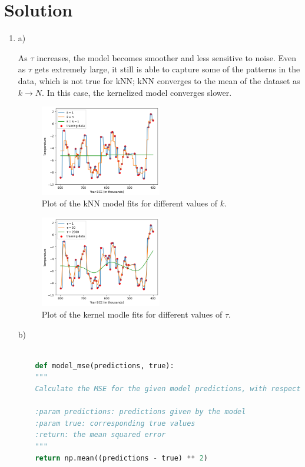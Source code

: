\documentclass[submit]{../harvardml}
\newenvironment{solution}
  {\color{blue}\section*{Solution}}
{}
\begin{document}
\newpage
\begin{solution}


\begin{enumerate}
  \item a) 

  As $\tau$ increases, the model becomes smoother and less sensitive to noise.
  Even as  $\tau$ gets extremely large, it still is able to capture some of the patterns in the data, which is not true for kNN; kNN converges to the mean of the dataset as $k \to N$. In this case, the kernelized model converges slower. 

  \begin{figure}[h]
    \centering
    \includegraphics[width=0.5\textwidth]{img_output/p1.1a.png}
    \caption{Plot of the kNN model fits for different values of $k$.}
  \end{figure}


  \begin{figure}[h]
    \centering
    \includegraphics[width=0.5\textwidth]{img_output/p1.2a.png}
    \caption{Plot of the kernel modle fits for different values of $\tau$.}
  \end{figure}

  b)
  \begin{lstlisting}[language=Python]

    def model_mse(predictions, true):
    """
    Calculate the MSE for the given model predictions, with respect to the true values

    :param predictions: predictions given by the model
    :param true: corresponding true values
    :return: the mean squared error
    """
    return np.mean((predictions - true) ** 2)


\end{lstlisting}
\end{enumerate}
\end{solution}
\end{document}
